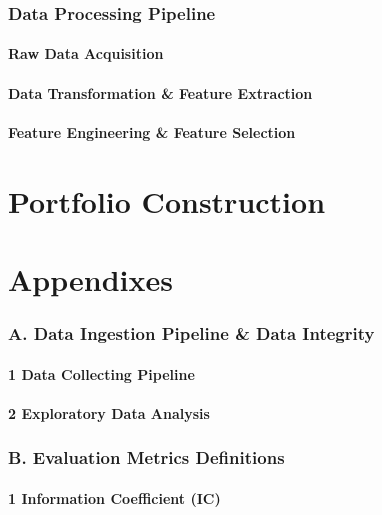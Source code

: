 \documentclass[twoside,final]{hcmut-report}
\begin{document}
\section{Data Processing Pipeline}
\subsection{Raw Data Acquisition}
\subsection{Data Transformation \& Feature Extraction}
\subsection{Feature Engineering \& Feature Selection}

\section{}

\newpage
\part{Portfolio Construction}

\newpage
\part{Appendixes}
\section*{A. Data Ingestion Pipeline \& Data Integrity}
\label{appendix_A}
\subsection*{1 Data Collecting Pipeline}
\subsection*{2 Exploratory Data Analysis}

\section*{B. Evaluation Metrics Definitions}
\label{appendix_B}
\subsection*{1 Information Coefficient (IC)}
\end{document}
